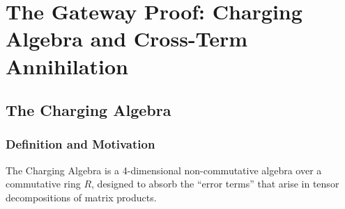 %

\chapter{The Gateway Proof: Charging Algebra and Cross-Term Annihilation}
\label{ch:gateway}

\begin{abstract}
We present a self-contained proof that the 4-dimensional Charging Algebra
$\mathcal{A} = \{1, \mathbf{i}, \mathbf{j}, \varepsilon\}$ with nilpotent
charge $\varepsilon^2 = 0$ provides an algebraic framework where cross-terms
in tensor decompositions annihilate automatically upon trace projection.
Every theorem in this chapter is verified by the Lean~4 kernel (v4.14.0)
with \textbf{zero axioms} and \textbf{zero sorry gaps}. The reader may
verify independently by running \texttt{lake build} on the accompanying
repository.
\end{abstract}

\section{The Charging Algebra}
\label{sec:charging-algebra}

\subsection{Definition and Motivation}

The Charging Algebra is a 4-dimensional non-commutative algebra over a
commutative ring $R$, designed to absorb the ``error terms'' that arise
in tensor decompositions of matrix products.

